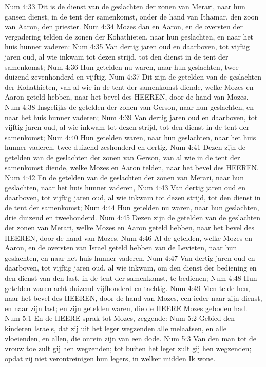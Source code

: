Num 4:33  Dit is de dienst van de geslachten der zonen van Merari, naar hun gansen dienst, in de tent der samenkomst, onder de hand van Ithamar, den zoon van Aaron, den priester.
Num 4:34  Mozes dan en Aaron, en de oversten der vergadering telden de zonen der Kohathieten, naar hun geslachten, en naar het huis hunner vaderen:
Num 4:35  Van dertig jaren oud en daarboven, tot vijftig jaren oud, al wie inkwam tot dezen strijd, tot den dienst in de tent der samenkomst;
Num 4:36  Hun getelden nu waren, naar hun geslachten, twee duizend zevenhonderd en vijftig.
Num 4:37  Dit zijn de getelden van de geslachten der Kohathieten, van al wie in de tent der samenkomst diende, welke Mozes en Aaron geteld hebben, naar het bevel des HEEREN, door de hand van Mozes.
Num 4:38  Insgelijks de getelden der zonen van Gerson, naar hun geslachten, en naar het huis hunner vaderen;
Num 4:39  Van dertig jaren oud en daarboven, tot vijftig jaren oud, al wie inkwam tot dezen strijd, tot den dienst in de tent der samenkomst;
Num 4:40  Hun getelden waren, naar hun geslachten, naar het huis hunner vaderen, twee duizend zeshonderd en dertig.
Num 4:41  Dezen zijn de getelden van de geslachten der zonen van Gerson, van al wie in de tent der samenkomst diende, welke Mozes en Aaron telden, naar het bevel des HEEREN.
Num 4:42  En de getelden van de geslachten der zonen van Merari, naar hun geslachten, naar het huis hunner vaderen,
Num 4:43  Van dertig jaren oud en daarboven, tot vijftig jaren oud, al wie inkwam tot dezen strijd, tot den dienst in de tent der samenkomst;
Num 4:44  Hun getelden nu waren, naar hun geslachten, drie duizend en tweehonderd.
Num 4:45  Dezen zijn de getelden van de geslachten der zonen van Merari, welke Mozes en Aaron geteld hebben, naar het bevel des HEEREN, door de hand van Mozes.
Num 4:46  Al de getelden, welke Mozes en Aaron, en de oversten van Israel geteld hebben van de Levieten, naar hun geslachten, en naar het huis hunner vaderen,
Num 4:47  Van dertig jaren oud en daarboven, tot vijftig jaren oud, al wie inkwam, om den dienst der bediening en den dienst van den last, in de tent der samenkomst, te bedienen;
Num 4:48  Hun getelden waren acht duizend vijfhonderd en tachtig.
Num 4:49  Men telde hen, naar het bevel des HEEREN, door de hand van Mozes, een ieder naar zijn dienst, en naar zijn last; en zijn getelden waren, die de HEERE Mozes geboden had.
Num 5:1  En de HEERE sprak tot Mozes, zeggende:
Num 5:2  Gebied den kinderen Israels, dat zij uit het leger wegzenden alle melaatsen, en alle vloeienden, en allen, die onrein zijn van een dode.
Num 5:3  Van den man tot de vrouw toe zult gij hen wegzenden; tot buiten het leger zult gij hen wegzenden; opdat zij niet verontreinigen hun legers, in welker midden Ik wone.
